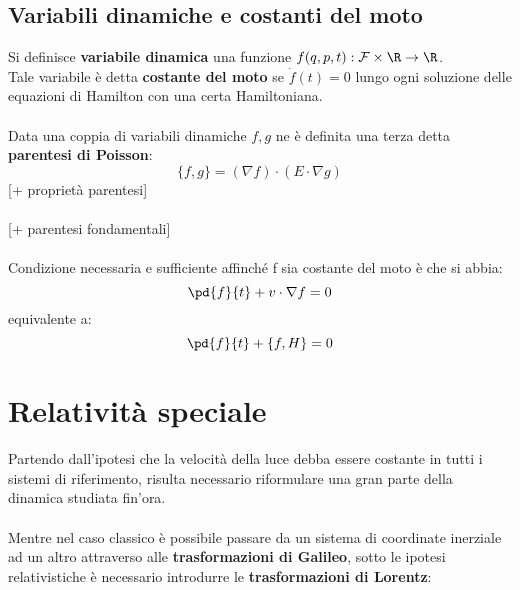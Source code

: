 \documentclass{article}
\begin{document}
\subsection{Variabili dinamiche e costanti del moto}
Si definisce \textbf{variabile dinamica} una funzione $f(q,p,t):\mathcal{F}\times\R\rightarrow\R$.\\
Tale variabile è detta \textbf{costante del moto} se $\dot f(t)=0$ lungo ogni soluzione delle equazioni di Hamilton con una certa Hamiltoniana.\\\\
Data una coppia di variabili dinamiche $f,g$ ne è definita una terza detta \textbf{parentesi di Poisson}:
$$ \{f,g\}=(\nabla f) \cdot (E\cdot\nabla g) $$
\small[+ proprietà parentesi]\\\\
\small[+ parentesi fondamentali]\\\\
Condizione necessaria e sufficiente affinché f sia costante del moto è che si abbia:
$$ \pd{f}{t}+v\cdot\nabla f=0 $$
equivalente a:
$$ \pd{f}{t}+\{f,H\}=0 $$





\newpage
\section{Relatività speciale}
Partendo dall'ipotesi che la velocità della luce debba essere costante in tutti i sistemi di riferimento, risulta necessario riformulare una gran parte della dinamica studiata fin'ora.\\\\
Mentre nel caso classico è possibile passare da un sistema di coordinate inerziale ad un altro attraverso alle \textbf{trasformazioni di Galileo}, sotto le ipotesi relativistiche è necessario introdurre le \textbf{trasformazioni di Lorentz}:
\end{document}
